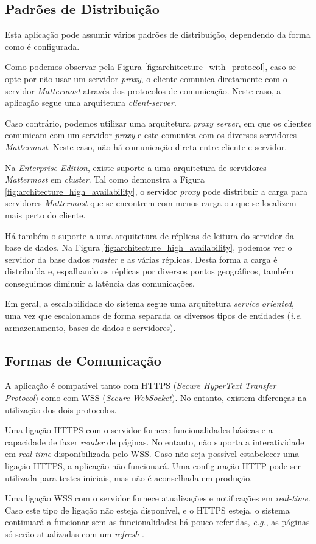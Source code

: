 \subsection{Padrões de Distribuição}
Esta aplicação pode assumir vários padrões de distribuição, dependendo da forma como é configurada.
\par
Como podemos observar pela Figura \ref{fig:architecture_with_protocol}, caso se opte por não usar um servidor \textit{proxy}, o cliente comunica diretamente com o servidor \textit{Mattermost} através dos protocolos de comunicação. Neste caso, a aplicação segue uma arquitetura \textit{client-server}.
\par
Caso contrário, podemos utilizar uma arquitetura \textit{proxy server}, em que os clientes comunicam com um servidor \textit{proxy} e este comunica com os diversos servidores \textit{Mattermost}. Neste caso, não há comunicação direta entre cliente e servidor.
\par
Na \textit{Enterprise Edition}, existe suporte a uma arquitetura de servidores \textit{Mattermost} em \textit{cluster}. Tal como demonstra a Figura \ref{fig:architecture_high_availability}, o servidor \textit{proxy} pode distribuir a carga para servidores \textit{Mattermost} que se encontrem com menos carga ou que se localizem mais perto do cliente.
\par
Há também o suporte a uma arquitetura de réplicas de leitura do servidor da base de dados. Na Figura \ref{fig:architecture_high_availability}, podemos ver o servidor da base dados \textit{master} e as várias réplicas. Desta forma a carga é distribuída e, espalhando as réplicas por diversos pontos geográficos, também conseguimos diminuir a latência das comunicações.
\par
Em geral, a escalabilidade do sistema segue uma arquitetura \textit{service oriented}, uma vez que escalonamos de forma separada os diversos tipos de entidades (\textit{i.e.} armazenamento, bases de dados e servidores).
\par


\subsection{Formas de Comunicação}
A aplicação é compatível tanto com HTTPS (\textit{Secure HyperText Transfer Protocol}) como com WSS (\textit{Secure WebSocket}). No entanto, existem diferenças na utilização dos dois protocolos.
\par
Uma ligação HTTPS com o servidor fornece funcionalidades básicas e a capacidade de fazer \textit{render} de páginas. No entanto, não suporta a interatividade em \textit{real-time} disponibilizada pelo WSS. Caso não seja possível estabelecer uma ligação HTTPS, a aplicação não funcionará. Uma configuração HTTP pode ser utilizada para testes iniciais, mas não é aconselhada em produção.
\par
Uma ligação WSS com o servidor fornece atualizações e notificações em \textit{real-time}. Caso este tipo de ligação não esteja disponível, e o HTTPS esteja, o sistema continuará a funcionar sem as funcionalidades há pouco referidas, \textit{e.g.}, as páginas só serão atualizadas com um \textit{refresh} \cite{deployment_communication}.
\par

